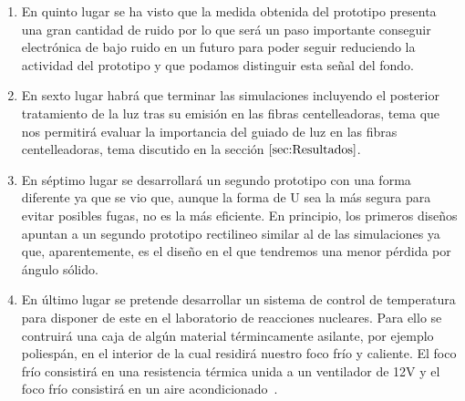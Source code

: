 \begin{enumerate}
\item {} En quinto lugar se ha visto que la medida obtenida del prototipo presenta una gran cantidad de ruido por lo que será un paso importante conseguir electrónica de bajo ruido en un futuro para poder seguir reduciendo la actividad del prototipo y que podamos distinguir esta señal del fondo.

\item {} En sexto lugar habrá que terminar las simulaciones incluyendo el posterior tratamiento de la luz tras su emisión en las fibras centelleadoras, tema que nos permitirá evaluar la importancia del guiado de luz en las fibras centelleadoras, tema discutido en la sección $\ref{sec:Resultados}$.

\item {} En séptimo lugar se desarrollará un segundo prototipo con una forma diferente ya que se vio que, aunque la forma de U sea la más segura para evitar posibles fugas, no es la más eficiente. En principio, los primeros diseños apuntan a un segundo prototipo rectilineo similar al de las simulaciones ya que, aparentemente, es el diseño en el que tendremos una menor pérdida por ángulo sólido.

\item {} En último lugar se pretende desarrollar un sistema de control de temperatura para disponer de este en el laboratorio de reacciones nucleares. Para ello se contruirá una caja de algún material términcamente asilante, por ejemplo poliespán, en el interior de la cual residirá nuestro foco frío y caliente. El foco frío consistirá en una resistencia térmica unida  a un ventilador de 12V y el foco frío consistirá en un aire acondicionado~\cite{Camara}.

\end{enumerate}